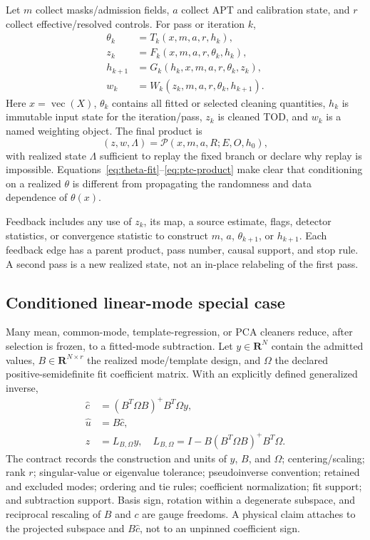 \documentclass[11pt]{article}
\newcommand{\R}{\mathbf{R}}
\begin{document}
Let $m$ collect masks/admission fields, $a$ collect APT and calibration state,
and $r$ collect effective/resolved controls.  For pass or iteration $k$,
\begin{align}
 \theta_k &= T_k(x,m,a,r,h_k),
   \label{eq:theta-fit}\\
 z_k &= F_k(x,m,a,r,\theta_k,h_k),
   \label{eq:clean-op}\\
 h_{k+1} &= G_k(h_k,x,m,a,r,\theta_k,z_k),
   \label{eq:state-update}\\
 w_k &= W_k(z_k,m,a,r,\theta_k,h_{k+1}).
   \label{eq:weight-op}
\end{align}
Here $x=\operatorname{vec}(X)$, $\theta_k$ contains all fitted or selected
cleaning quantities, $h_k$ is immutable input state for the iteration/pass,
$z_k$ is cleaned TOD, and $w_k$ is a named weighting object.  The final
product is
\begin{equation}
 (z,w,\Lambda)=\mathcal P(x,m,a,R;E,O,h_0),
 \label{eq:ptc-product}
\end{equation}
with realized state $\Lambda$ sufficient to replay the fixed branch or declare why
replay is impossible.  Equations~\eqref{eq:theta-fit}--\eqref{eq:ptc-product}
make clear that conditioning on a realized $\theta$ is different from
propagating the randomness and data dependence of $\theta(x)$.

Feedback includes any use of $z_k$, its map, a source estimate, flags,
detector statistics, or convergence statistic to construct $m$, $a$,
$\theta_{k+1}$, or $h_{k+1}$.  Each feedback edge has a parent product, pass
number, causal support, and stop rule.  A second pass is a new realized state,
not an in-place relabeling of the first pass.

\subsection{Conditioned linear-mode special case}

Many mean, common-mode, template-regression, or PCA cleaners reduce, after
selection is frozen, to a fitted-mode subtraction.  Let $y\in\R^N$ contain
the admitted values, $B\in\R^{N\times r}$ the realized mode/template design,
and $\Omega$ the declared positive-semidefinite fit coefficient matrix.  With an explicitly
defined generalized inverse,
\begin{align}
 \widehat c &= (B^T\Omega B)^{+}B^T\Omega y,
   \label{eq:mode-coeff}\\
 \widehat u &= B\widehat c,
   \label{eq:mode-estimate}\\
 z &= L_{B,\Omega}y,
 \quad L_{B,\Omega}=I-B(B^T\Omega B)^{+}B^T\Omega.
   \label{eq:linear-cleaner}
\end{align}
The contract records the construction and units of $y$, $B$, and $\Omega$;
centering/scaling; rank $r$; singular-value or eigenvalue tolerance;
pseudoinverse convention; retained and excluded modes; ordering and tie
rules; coefficient normalization; fit support; and subtraction support.
Basis sign, rotation within a degenerate subspace, and reciprocal rescaling of
$B$ and $c$ are gauge freedoms.  A physical claim attaches to the projected
subspace and $B\widehat c$, not to an unpinned coefficient sign.
\end{document}
